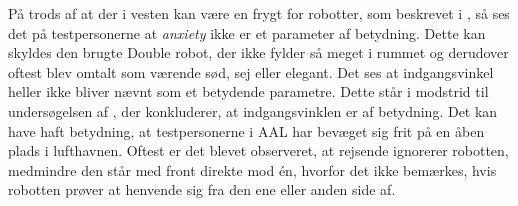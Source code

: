 %
På trods af at der i vesten kan være en frygt for robotter, som beskrevet i , så ses det på testpersonerne at \textit{anxiety} ikke er et parameter af betydning. Dette kan skyldes den brugte Double robot, der ikke fylder så meget i rummet og derudover oftest blev omtalt som værende sød, sej eller elegant. \blankline
%
Det ses at indgangsvinkel heller ikke bliver nævnt som et betydende parametre. Dette står i modstrid til undersøgelsen af \textcite{PDF:HowMayIServeYou}, der konkluderer, at indgangsvinklen er af betydning. Det kan have haft betydning, at testpersonerne i AAL har bevæget sig frit på en åben plads i lufthavnen. Oftest er det blevet observeret, at rejsende ignorerer robotten, medmindre den står med front direkte mod én, hvorfor det ikke bemærkes, hvis robotten prøver at henvende sig fra den ene eller anden side af. 







